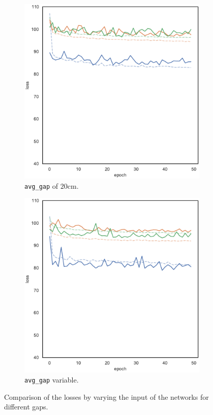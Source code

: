 \begin{figure}[!htb]
\begin{subfigure}[h]{0.3\textwidth}
		\includegraphics[width=\textwidth]{contents/images/task1-extension/loss-distributed-gap_20@copy}%
		\caption{\texttt{avg\_gap} of $20$\gls{cm}.}
	\end{subfigure}
	\hfill
	\begin{subfigure}[h]{0.3\textwidth}
		\centering
		\includegraphics[width=\textwidth]{contents/images/task1-extension/loss-distributed-gap_var@copy}
		\caption{\texttt{avg\_gap} variable.}
	\end{subfigure}
		\caption[Losses summary of the second set of 
		experiments.]{Comparison of the losses by varying the input of the networks 
		for different gaps.}
	\label{fig:distloss820var}
	\vspace{-0.5cm}
\end{figure}

